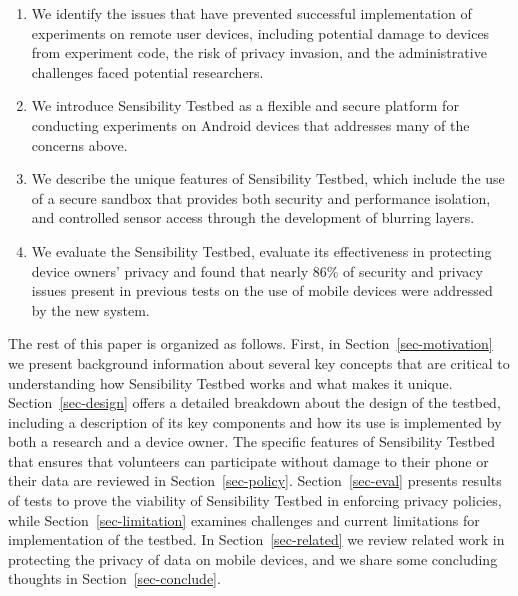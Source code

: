 \begin{enumerate}
\item We identify the issues that have prevented successful implementation
of experiments on remote user devices, including potential damage to
devices from experiment code, the risk of privacy invasion, and the
administrative challenges faced potential researchers.

\item We introduce Sensibility Testbed as a flexible and secure platform for
conducting experiments on Android devices that addresses many of the
concerns above.

\item We describe the unique features of Sensibility Testbed, which include
the use of a secure sandbox that provides both security and
performance isolation, and controlled sensor access through the
development of blurring layers.

\item We evaluate the Sensibility Testbed, evaluate its effectiveness in
protecting device owners' privacy and found that nearly 86\% of
security and privacy issues present in previous tests on the use of
mobile devices were addressed by the new system.
\end{enumerate}

The rest of this paper is organized as follows. First, in Section~\ref{sec-motivation} we
present background information about several key concepts that are
critical to understanding how Sensibility Testbed works and what makes
it unique. Section~\ref{sec-design} offers a detailed breakdown about the design of
the testbed, including a description of its key components and how its
use is implemented by both a research and a device owner. The specific
features of Sensibility Testbed that ensures that volunteers can
participate without damage to their phone or their data are reviewed
in Section~\ref{sec-policy}. Section~\ref{sec-eval} presents results of tests to prove the
viability of Sensibility Testbed in enforcing privacy policies, while
Section~\ref{sec-limitation} examines challenges and current limitations for
implementation of the testbed. In Section~\ref{sec-related} we review related work
in protecting the privacy of data on mobile devices, and we share some
concluding thoughts in Section~\ref{sec-conclude}.

